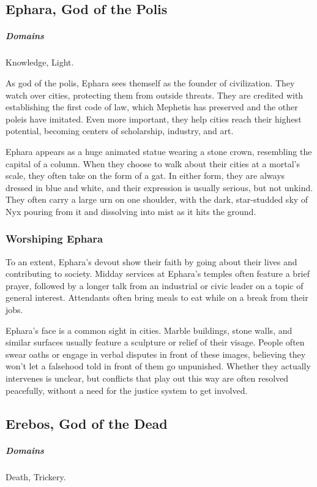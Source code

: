 \subsection*{Ephara, God of the Polis} \label{ssec::ephara}
    \subparagraph{Domains} Knowledge, Light.

    As god of the polis, Ephara sees themself as the founder of civilization.
    They watch over cities, protecting them from outside threats.
    They are credited with establishing the first code of law, which Mephetis has preserved and the other poleis have imitated.
    Even more important, they help cities reach their highest potential, becoming centers of scholarship, industry, and art.

    Ephara appears as a huge animated statue wearing a stone crown, resembling the capital of a column.
    When they choose to walk about their cities at a mortal's scale, they often take on the form of a gat.
    In either form, they are always dressed in blue and white, and their expression is usually serious, but not unkind.
    They often carry a large urn on one shoulder, with the dark, star-studded sky of Nyx pouring from it and dissolving into mist as it hits the ground.

    \subsubsection{Worshiping Ephara}
        To an extent, Ephara's devout show their faith by going about their lives and contributing to society.
        Midday services at Ephara's temples often feature a brief prayer, followed by a longer talk from an industrial or civic leader on a topic of general interest.
        Attendants often bring meals to eat while on a break from their jobs.

        Ephara's face is a common sight in cities.
        Marble buildings, stone walls, and similar surfaces usually feature a sculpture or relief of their visage.
        People often swear oaths or engage in verbal disputes in front of these images, believing they won't let a falsehood told in front of them go unpunished.
        Whether they actually intervenes is unclear, but conflicts that play out this way are often resolved peacefully, without a need for the justice system to get involved.

\subsection*{Erebos, God of the Dead} \label{ssec::erebos}
    \subparagraph{Domains} Death, Trickery.

